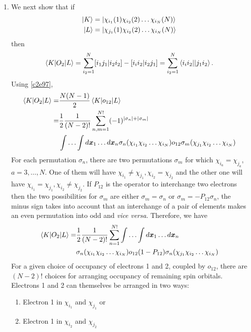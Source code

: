 \begin{enumerate}
\item\label{c2r8}  We next show that if 
\[
\begin{aligned}
\ket{K} &= \ket{\chi_{i_1}(1)\chi_{i_2}(2)\ldots\chi_{i_N}(N)} \\
\ket{L} &=\ket{\chi_{j_1}(1)\chi_{i_2}(2)\ldots\chi_{i_N}(N)}
\end{aligned}
\]
then
\begin{equation}\label{c2e99}
\braket{K|O_2|L} = \sum_{i_2=1}^N[i_1j_1|i_2i_2] - [i_ii_2|i_2j_1]
= \sum_{i_2=1}^N\braket{i_ii_2||j_1i_2}.
\end{equation}
Using \eqref{c2e97},
\[
\begin{aligned}
\braket{K|O_2|L} =& \frac{N(N-1)}{2}\braket{K|o_{12}|L} \\
 =& \frac{1}{2}\frac{1}{(N-2)!}\sum_{n,m=1}^{N!}(-1)^{|\sigma_n|+|\sigma_m|} \\
  & \int\ldots\int d\bm{x}_1\ldots d\bm{x}_n \sigma_n(\chi_{i_1}\chi_{i_2}
  \ldots\chi_{i_N})o_{12}\sigma_m(\chi_{j_1}\chi_{i_2}\ldots\chi_{i_N})
\end{aligned}
\]
For each permutation $\sigma_n$, there are two permutations $\sigma_m$ for 
which $\chi_{i_a} = \chi_{j_a}$, $a = 3, \ldots, N$. One of them will have
$\chi_{i_1} \ne \chi_{j_1}, \chi_{i_2} = \chi_{j_2}$ and the other one will have
$\chi_{i_1} = \chi_{j_1}, \chi_{i_2} \ne \chi_{j_2}$. If $P_{12}$ is the 
operator to interchange two electrons then the two possibilities for $\sigma_m$
are either $\sigma_m = \sigma_n$ or $\sigma_m = -P_{12}\sigma_n$, the minus
sign takes into account that an interchange of a pair of elements makes an even
permutation into odd and \emph{vice versa}. Therefore, we have
\[
\begin{aligned}
\braket{K|O_2|L} =& \frac{1}{2}\frac{1}{(N-2)!}\sum_{n=1}^{N!}
 \int\ldots\int d\bm{x}_1\ldots d\bm{x}_n \\
 &\sigma_n(\chi_{i_1}\chi_{i_2} \ldots\chi_{i_N})o_{12}(1 - P_{12})
  \sigma_n(\chi_{j_1}\chi_{i_2}\ldots\chi_{i_N})
\end{aligned}
\]
For a given choice of occupancy of electrons 1 and 2, coupled by $o_{12}$,
there are $(N-2)!$ choices for arranging occupancy of remaining spin orbitals.
Electrons 1 and 2 can themselves be arranged in two ways:
\begin{enumerate}
\item Electron 1 in $\chi_{i_1}$ and $\chi_{j_1}$ or
\item Electron 1 in $\chi_{i_2}$ and $\chi_{j_2}$
\end{enumerate}

\end{enumerate}
